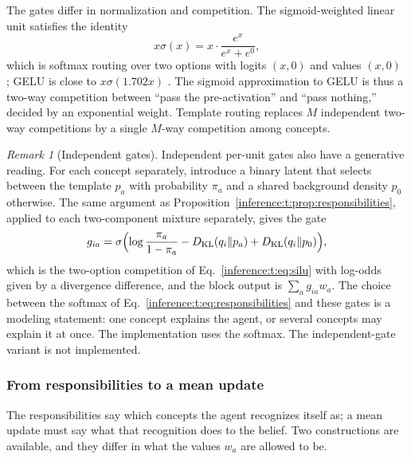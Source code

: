 \documentclass[11pt]{article}
\theoremstyle{definition}
\theoremstyle{remark}
\newtheorem{remark}[theorem]{Remark}
\providecommand{\KL}{D_{\mathrm{KL}}}
\begin{document}
The gates differ in normalization and competition. The sigmoid-weighted linear unit satisfies the identity
\begin{equation}
x\sigma(x)=x\cdot\frac{e^{x}}{e^{x}+e^{0}},
\label{inference:t:eq:silu}
\end{equation}
which is softmax routing over two options with logits $(x,0)$ and values $(x,0)$ \citep{links:elfwing2018silu,inference:ramachandran2017}; GELU is close to $x\sigma(1.702x)$ \citep{links:hendrycks2016gelu}. The sigmoid approximation to GELU is thus a two-way competition between ``pass the pre-activation'' and ``pass nothing,'' decided by an exponential weight. Template routing replaces $M$ independent two-way competitions by a single $M$-way competition among concepts.

\begin{remark}[Independent gates]
\label{inference:t:rem:independent}
Independent per-unit gates also have a generative reading. For each concept separately, introduce a binary latent that selects between the template $p_a$ with probability $\pi_a$ and a shared background density $p_0$ otherwise. The same argument as Proposition~\ref{inference:t:prop:responsibilities}, applied to each two-component mixture separately, gives the gate
\begin{equation}
g_{ia}=\sigma\Bigl(\log\frac{\pi_a}{1-\pi_a}-\KL(q_i\|p_a)+\KL(q_i\|p_0)\Bigr),
\end{equation}
which is the two-option competition of Eq.~\eqref{inference:t:eq:silu} with log-odds given by a divergence difference, and the block output is $\sum_ag_{ia}w_a$. The choice between the softmax of Eq.~\eqref{inference:t:eq:responsibilities} and these gates is a modeling statement: one concept explains the agent, or several concepts may explain it at once. The implementation uses the softmax. The independent-gate variant is not implemented.
\end{remark}

\subsubsection{From responsibilities to a mean update}
\label{inference:t:sec:update}

The responsibilities say which concepts the agent recognizes itself as; a mean update must say what that recognition does to the belief. Two constructions are available, and they differ in what the values $w_a$ are allowed to be.
\end{document}
